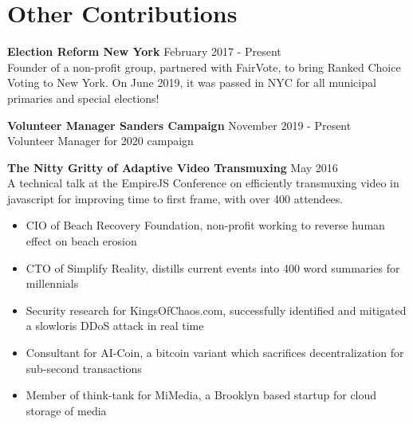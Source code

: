 \section{Other Contributions}
  \begin{flushleft}

    \textbf{Election Reform New York} \hfill February  2017 - Present\\
    Founder of a non-profit group, partnered with FairVote, to bring Ranked Choice Voting to New York.
    On June 2019, it was passed in NYC for all municipal primaries and special elections!
    \vspace{10pt}    


    \textbf{Volunteer Manager Sanders Campaign} \hfill November  2019 - Present\\
    Volunteer Manager for 2020 campaign 
    \vspace{10pt}     
        
    \textbf{The Nitty Gritty of Adaptive Video Transmuxing} \hfill May  2016\\
    A technical talk at the EmpireJS Conference on efficiently transmuxing video in javascript for improving time to first frame, with over 400 attendees.
    \vspace{10pt}
    
    \begin{itemize}
    \item CIO of Beach Recovery Foundation, non-profit working to reverse human effect on beach erosion
    \item CTO of Simplify Reality, distills current events into 400 word summaries for millennials
    \item Security research for KingsOfChaos.com, successfully identified and mitigated a slowloris DDoS attack in real time
    \item Consultant for AI-Coin, a bitcoin variant which sacrifices decentralization for sub-second transactions
    \item Member of think-tank for MiMedia, a Brooklyn based startup for cloud storage of media
    \end{itemize}
  \end{flushleft}


